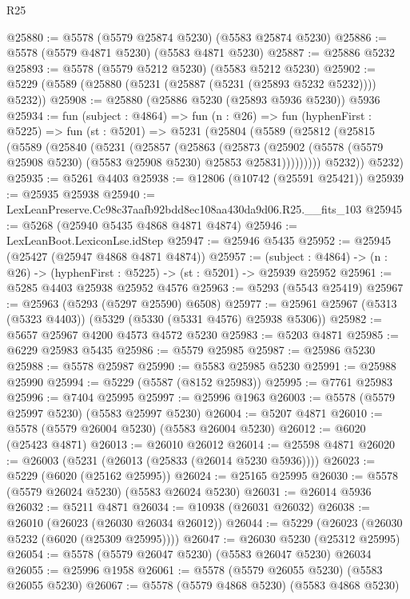 \begin{lexlean}{R25}
\begin{coremodule}
@25880 := @5578 (@5579 @25874 @5230) (@5583 @25874 @5230)
@25886 := @5578 (@5579 @4871 @5230) (@5583 @4871 @5230)
@25887 := @25886 @5232
@25893 := @5578 (@5579 @5212 @5230) (@5583 @5212 @5230)
@25902 := @5229 (@5589 (@25880 (@5231 (@25887 (@5231 (@25893 @5232 @5232)))) @5232))
@25908 := @25880 (@25886 @5230 (@25893 @5936 @5230)) @5936
@25934 := fun (subject : @4864) =>
  fun (n : @26) =>
  fun (hyphenFirst : @5225) =>
  fun (st : @5201) =>
  @5231
    (@25804
      (@5589
        (@25812
          (@25815
            (@5589
              (@25840
                (@5231
                  (@25857
                    (@25863
                      (@25873
                        (@25902
                          (@5578 (@5579 @25908 @5230) (@5583 @25908 @5230) @25853 @25831)))))))))
          @5232))
      @5232)
@25935 := @5261 @4403
@25938 := @12806 (@10742 (@25591 @25421))
@25939 := @25935 @25938
@25940 := LexLeanPreserve.Cc98c37aafb92bdd8ec108aa430da9d06.R25.__fits_103
@25945 := @5268 (@25940 @5435 @4868 @4871 @4874)
@25946 := LexLeanBoot.LexiconLse.idStep
@25947 := @25946 @5435
@25952 := @25945 (@25427 (@25947 @4868 @4871 @4874))
@25957 := (subject : @4864) -> (n : @26) -> (hyphenFirst : @5225) -> (st : @5201) -> @25939 @25952
@25961 := @5285 @4403 @25938 @25952 @4576
@25963 := @5293 (@5543 @25419)
@25967 := @25963 (@5293 (@5297 @25590) @6508)
@25977 := @25961 @25967 (@5313 (@5323 @4403)) (@5329 (@5330 (@5331 @4576) @25938 @5306))
@25982 := @5657 @25967 @4200 @4573 @4572 @5230
@25983 := @5203 @4871
@25985 := @6229 @25983 @5435
@25986 := @5579 @25985
@25987 := @25986 @5230
@25988 := @5578 @25987
@25990 := @5583 @25985 @5230
@25991 := @25988 @25990
@25994 := @5229 (@5587 (@8152 @25983))
@25995 := @7761 @25983
@25996 := @7404 @25995
@25997 := @25996 @1963
@26003 := @5578 (@5579 @25997 @5230) (@5583 @25997 @5230)
@26004 := @5207 @4871
@26010 := @5578 (@5579 @26004 @5230) (@5583 @26004 @5230)
@26012 := @6020 (@25423 @4871)
@26013 := @26010 @26012
@26014 := @25598 @4871
@26020 := @26003 (@5231 (@26013 (@25833 (@26014 @5230 @5936))))
@26023 := @5229 (@6020 (@25162 @25995))
@26024 := @25165 @25995
@26030 := @5578 (@5579 @26024 @5230) (@5583 @26024 @5230)
@26031 := @26014 @5936
@26032 := @5211 @4871
@26034 := @10938 (@26031 @26032)
@26038 := @26010 (@26023 (@26030 @26034 @26012))
@26044 := @5229 (@26023 (@26030 @5232 (@6020 (@25309 @25995))))
@26047 := @26030 @5230 (@25312 @25995)
@26054 := @5578 (@5579 @26047 @5230) (@5583 @26047 @5230) @26034
@26055 := @25996 @1958
@26061 := @5578 (@5579 @26055 @5230) (@5583 @26055 @5230)
@26067 := @5578 (@5579 @4868 @5230) (@5583 @4868 @5230)

\end{coremodule}
\end{lexlean}
